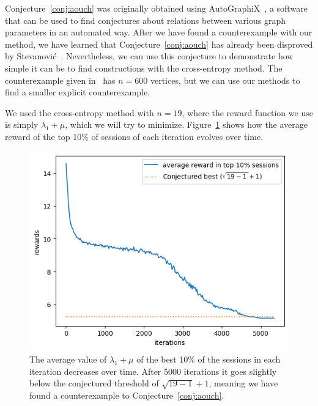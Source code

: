 \documentclass[11pt,english]{article}
\theoremstyle{plain}
\theoremstyle{remark}
\begin{document}
Conjecture~\ref{conj:aouch} was originally obtained using AutoGraphiX~\cite{autographix}, a software that can be used to find conjectures about relations between various graph parameters in an automated way. After we have found a counterexample with our method, we have learned that Conjecture~\ref{conj:aouch} has already been disproved by Stevanovi\'c~\cite{stevanovic}. Nevertheless, we can use this conjecture to demonstrate how simple it can be to find constructions with the cross-entropy method. The counterexample given in~\cite{stevanovic} has $n=600$ vertices, but we can use our methods to find a smaller explicit counterexample.

We used the cross-entropy method with $n=19$, where the reward function we use is simply $\lambda_1+\mu$, which we will try to minimize. Figure~\ref{fig:aouch_evolve} shows how the average reward of the top 10\% of sessions of each iteration evolves over time. 

\begin{figure}[hbt]
    \centering
    \includegraphics[scale=0.8]{scores.png}
    \caption{The average value of $\lambda_1+\mu$ of the best 10\% of the sessions in each iteration decreases over time. After 5000 iterations it goes slightly below the conjectured threshold of $\sqrt{19-1}+1$, meaning we have found a counterexample to Conjecture~\ref{conj:aouch}.}
    \label{fig:aouch_evolve}
\end{figure}
\end{document}
